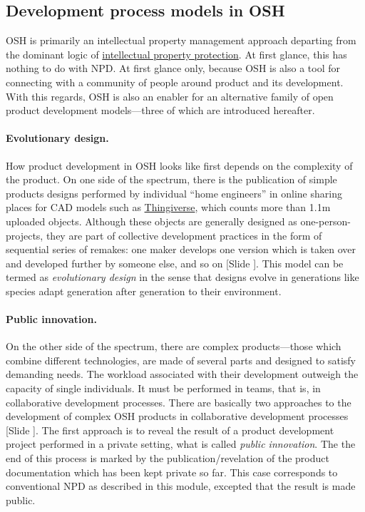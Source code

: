 \documentclass{article}
\newcounter{slide}
\begin{document}
\subsection{Development process models in OSH}
\label{sec:dvppractices}

OSH is primarily an intellectual property management approach departing from the dominant logic of \href{https://en.wikipedia.org/wiki/Intellectual_property}{intellectual property protection}. At first glance, this has nothing to do with NPD. At first glance only, because OSH is also a tool for connecting with a community of people around product and its development. With this regards, OSH is also an enabler for an alternative family of open product development models---three of which are introduced hereafter.

\paragraph{Evolutionary design.}How product development in OSH looks like first depends on the complexity of the product. On one side of the spectrum, there is the publication of simple products designs performed by individual ``home engineers'' in online sharing places for CAD models such as \href{http://thingiverse.com/}{Thingiverse}, which counts more than 1.1m uploaded objects. Although these objects are generally designed as one-person-projects, they are part of collective development practices in the form of sequential series of remakes: one maker develops one version which is taken over and developed further by someone else, and so on \cite{kyriakouKnowledgeReuseCustomization2017}{\color{blue}[Slide ]}. This model can be termed as \emph{evolutionary design} in the sense that designs evolve in generations like species adapt generation after generation to their environment. 

\paragraph{Public innovation.}On the other side of the spectrum, there are complex products---those which combine different technologies, are made of several parts and designed to satisfy demanding needs. The workload associated with their development outweigh the capacity of single individuals. It must be performed in teams, that is, in collaborative development processes. There are basically two approaches to the development of complex OSH products in collaborative development processes {\color{blue}[Slide ]}. The first approach is to reveal the result of a product development project performed in a private setting, what is called \emph{public innovation}. The the end of this process is marked by the publication/revelation of the product documentation which has been kept private so far. This case corresponds to conventional NPD as described in this module, excepted that the result is made public. 
\end{document}
